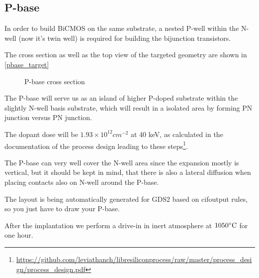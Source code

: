 \subsection{P-base}\label{pbase_chapter}

In order to build BiCMOS on the same substrate, a nested P-well within the N-well (now it's twin well) is required for building the bijunction transistors.

The cross section as well as the top view of the targeted geometry are shown in \autoref{pbase_target}

\begin{figure}[H]
	\centering
	\begin{tikzpicture}[node distance = 3cm, auto, thick,scale=\CrossAndTopSectionBig, every node/.style={transform shape}]
		
	\end{tikzpicture}
	\caption{P-base cross section}
	\label{pbase_target}
\end{figure}

The P-base will serve us as an island of higher P-doped substrate within the slightly N-well basis substrate, which will result in a isolated area by forming PN junction versus PN junction.

The dopant dose will be $1.93\times10^{12}cm^{-2}$ at 40 keV, as calculated in the documentation of the process design leading to these steps\footnote{\url{https://github.com/leviathanch/libresiliconprocess/raw/master/process_design/process_design.pdf}}.

The P-base can very well cover the N-well area since the expansion mostly is vertical, but it should be kept in mind, that there is also a lateral diffusion when placing contacts also on N-well around the P-base.

The layout is being automatically generated for GDS2 based on cifoutput rules, so you just have to draw your P-base.

After the implantation we perform a drive-in in inert atmosphere at $1050\degreesC$ for one hour.
